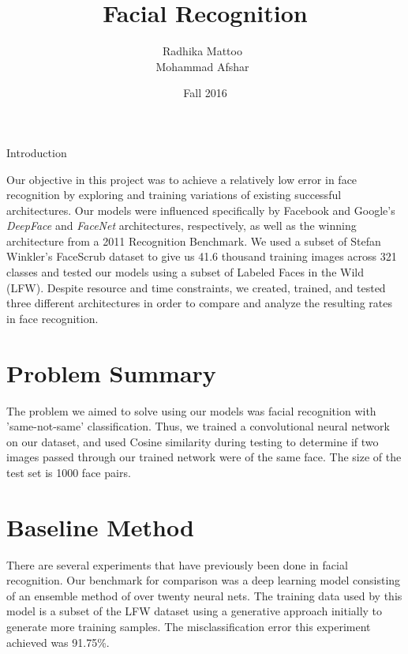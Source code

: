 \documentclass[11pt]{article}
\title{Facial Recognition}
\date{Fall 2016}
\author{
  Radhika Mattoo\
  \email{(rm3485@nyu.edu)}
  \\
  Mohammad Afshar\
  \email{(ma2510@nyu.edu)}
  \\
}
\begin{document}
\maketitle
\newcommand{\slugmaster}


\section{Introduction}
\par
Our objective in this project was to achieve a relatively low error in face recognition by exploring and training variations of existing successful architectures. Our models were influenced specifically by Facebook and Google's \textit{DeepFace} and \textit{FaceNet} architectures, respectively, as well as the winning architecture from a 2011 Recognition Benchmark. We used a subset of Stefan Winkler's FaceScrub dataset to give us 41.6 thousand training images across 321 classes and tested our models using a subset of Labeled Faces in the Wild (LFW). Despite resource and time constraints, we created, trained, and tested three different architectures in order to compare and analyze the resulting rates in face recognition.
\section{Problem Summary}
    \par
    The problem we aimed to solve using our models was facial recognition with 'same-not-same' classification. Thus, we trained a convolutional neural network on our dataset, and used Cosine similarity during testing to determine if two images passed through our trained network were of the same face. The size of the test set is 1000 face pairs.
\section{Baseline Method}
\par
There are several experiments that have previously been done in facial recognition. Our benchmark for comparison was a deep learning model consisting of an ensemble method of over twenty neural nets. The training data used by this model is a subset of the LFW dataset using a generative approach initially to generate more training samples. The misclassification error this experiment achieved was 91.75\%. 
\end{document}
